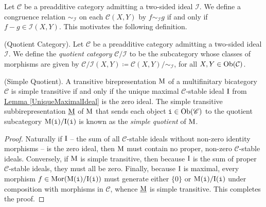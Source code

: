 \noindent Let $\mathcal{C}$ be a preadditive category admitting a two-sided ideal $\mathcal{I}$. We define a congruence relation $\sim_\mathcal{I}$ on each $\mathcal{C}(X, Y)$ by $f \sim_\mathcal{I} g$ if and only if $f - g \in \mathcal{I}(X, Y)$. This motivates the following definition.\newpage

\noindent\begin{definition}\!\textup{(Quotient Category).}\label{QuotientCategory } Let $\mathcal{C}$ be a preadditive category admitting a two-sided ideal $\mathcal{I}$. We define the {\em quotient category} $\mathcal{C}/\mathcal{I}$ to be the subcategory whose classes of morphisms are given by $\mathcal{C}/\mathcal{I}(X, Y) \coloneqq \mathcal{C}(X, Y)/\!\sim_\mathcal{I}$, for all $X, Y \in \textnormal{Ob}(\mathcal{C})$.\\%
\end{definition}

\noindent\begin{theoremdefinition}\!\textup{(Simple Quotient).}\label{SimpleQuotient} \!A transitive birepresentation $\textup{M}$ of a %
multifinitary bicategory $\mathscr{C}$ is simple transitive if and only if the unique maximal $\mathscr{C}$-stable ideal $\textup{I}$ from \hyperref[UniqueMaximalIdeal]{Lemma \ref*{UniqueMaximalIdeal}} is the zero ideal. The simple transitive subbirepresentation $\underline{\textup{M}}$ of $\textup{M}$ that sends each object $\textnormal{\texttt{i}} \in \textnormal{Ob}(\mathscr{C})$ to the quotient subcategory $\textup{M}(\textnormal{\texttt{i}})/\textup{I}(\textnormal{\texttt{i}})$ is known as the {\em simple quotient} of $\textup{M}$.\\
\end{theoremdefinition}

\noindent\begin{proof} Naturally if $\textup{I}$ -- the sum of all $\mathscr{C}$-stable ideals without non-zero identity morphisms -- is the zero ideal, then $\textup{M}$ must contain no proper, non-zero $\mathscr{C}$-stable ideals. Conversely, if $\textup{M}$ is simple transitive, then because $\textup{I}$ is the sum of proper $\mathscr{C}$-stable ideals, they must all be zero. Finally, because $\textup{I}$ is maximal, every morphism $f \in \textnormal{Mor}(\textup{M}(\textnormal{\texttt{i}})/\textup{I}(\textnormal{\texttt{i}}))$ must generate either $\{0\}$ or $\textup{M}(\textnormal{\texttt{i}})/\textup{I}(\textnormal{\texttt{i}})$ under composition with morphisms in $\mathscr{C}$, whence $\underline{\textup{M}}$ is simple transitive. This completes the proof.
\end{proof}\\

